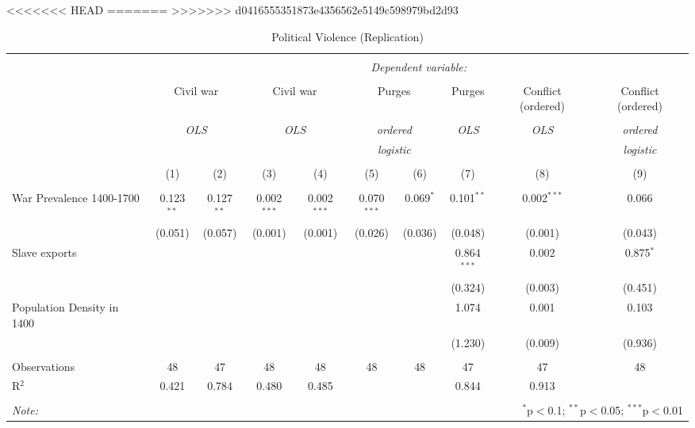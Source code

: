 
<<<<<<< HEAD
=======
>>>>>>> d0416555351873e4356562e5149c598979bd2d93
\begin{table}[!htbp] \centering 
  \caption{Political Violence (Replication)} 
  \label{} 
\footnotesize 
\begin{tabular}{@{\extracolsep{2pt}}lccccccccc} 
\\[-1.8ex]\hline 
\hline \\[-1.8ex] 
 & \multicolumn{9}{c}{\textit{Dependent variable:}} \\ 
\cline{2-10} 
\\[-1.8ex] & \multicolumn{2}{c}{Civil war} & \multicolumn{2}{c}{Civil war} & \multicolumn{2}{c}{Purges} & Purges & Conflict (ordered) & Conflict (ordered) \\ 
\\[-1.8ex] & \multicolumn{2}{c}{\textit{OLS}} & \multicolumn{2}{c}{\textit{OLS}} & \multicolumn{2}{c}{\textit{ordered}} & \textit{OLS} & \textit{OLS} & \textit{ordered} \\ 
 & \multicolumn{2}{c}{\textit{}} & \multicolumn{2}{c}{\textit{}} & \multicolumn{2}{c}{\textit{logistic}} & \textit{} & \textit{} & \textit{logistic} \\ 
\\[-1.8ex] & (1) & (2) & (3) & (4) & (5) & (6) & (7) & (8) & (9)\\ 
\hline \\[-1.8ex] 
 War Prevalence 1400-1700 & 0.123$^{**}$ & 0.127$^{**}$ & 0.002$^{***}$ & 0.002$^{***}$ & 0.070$^{***}$ & 0.069$^{*}$ & 0.101$^{**}$ & 0.002$^{***}$ & 0.066 \\ 
  & (0.051) & (0.057) & (0.001) & (0.001) & (0.026) & (0.036) & (0.048) & (0.001) & (0.043) \\ 
  Slave exports &  &  &  &  &  &  & 0.864$^{***}$ & 0.002 & 0.875$^{*}$ \\ 
  &  &  &  &  &  &  & (0.324) & (0.003) & (0.451) \\ 
  Population Density in 1400 &  &  &  &  &  &  & 1.074 & 0.001 & 0.103 \\ 
  &  &  &  &  &  &  & (1.230) & (0.009) & (0.936) \\ 
 \hline \\[-1.8ex] 
Observations & 48 & 47 & 48 & 48 & 48 & 48 & 47 & 47 & 48 \\ 
R$^{2}$ & 0.421 & 0.784 & 0.480 & 0.485 &  &  & 0.844 & 0.913 &  \\ 
\hline 
\hline \\[-1.8ex] 
\textit{Note:}  & \multicolumn{9}{r}{$^{*}$p$<$0.1; $^{**}$p$<$0.05; $^{***}$p$<$0.01} \\ 
\end{tabular} 
\end{table} 
